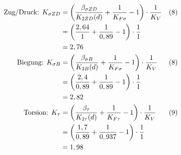 \begin{itemize}
	\begin{align*}
		\text{Zug/Druck: } K_{\sigma ZD} &= \left( \frac{\beta_{\sigma ZD}}{K_{2ZD} (d)} + \frac{1}{K_{F\sigma}} -1\right) \cdot \frac{1}{K_V} & (8) \\
		&= \left( \frac{2,64}{1} + \frac{1}{0,89} -1\right) \cdot \frac{1}{1} \\
		&= 2,76 \\
		\text{Biegung: } K_{\sigma B} &= \left( \frac{\beta_{\sigma B}}{K_{2B}(d)} + \frac{1}{K_{F\sigma}} -1\right) \cdot \frac{1}{K_V} & (8) \\
		&= \left( \frac{2,4}{0,89} + \frac{1}{0,89} -1\right) \cdot \frac{1}{1} \\
		&= 2,82 \\
		\text{Torsion: } K_{\tau} &= \left( \frac{\beta_{\tau}}{K_{2\tau}(d)} + \frac{1}{K_{F\tau}} -1\right) \cdot \frac{1}{K_V} & (9) \\
		&= \left( \frac{1,7}{0,89} + \frac{1}{0,937} -1\right) \cdot \frac{1}{1} \\
		&= 1,98 
	\end{align*}
\end{itemize}
